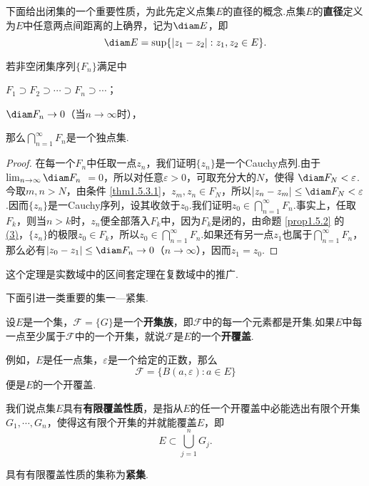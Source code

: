 下面给出闭集的一个重要性质，为此先定义点集$E$的直径的概念.点集$E$的\textbf{直径}定义为$E$中任意两点间距离的上确界，记为$\diam E$，即
\[\diam E=\sup\{|z_1-z_2|:z_1,z_2\in E\}.\]

\begin{theorem}\label{thm1.5.3}
  若非空闭集序列$\{F_n\}$满足中
  \begin{eenum}
    \item \label{thm1.5.3.1} $F_1\supset F_2\supset\cdots\supset F_n\supset\cdots$；
    \item \label{thm1.5.3.2} $\diam F_n\to 0$（当$n\to\infty$时），
  \end{eenum}
  那么$\bigcap_{n=1}^\infty F_n$是一个独点集.
\end{theorem}
\begin{proof}
在每一个$F_n$中任取一点$z_n$，我们证明$\{z_n\}$是一个Cauchy点列.由于$\lim_{n\to\infty}\diam F_n$ $=0$，所以对任意$\varepsilon>0$，可取充分大的$N$，使得 $\diam F_N<\varepsilon$.今取$m,n>N$，由条件 \ref{thm1.5.3.1}，$z_m,z_n\in F_N$，所以$|z_n-z_m|\le\diam F_N<\varepsilon$.因而$\{z_n\}$是一Cauchy序列，设其收敛于$z_0$.我们证明$z_0\in\bigcap_{n=1}^\infty F_n$.事实上，任取$F_k$，则当$n>k$时，$z_n$便全部落入$F_k$中，因为$F_k$是闭的，由命题 \ref{prop1.5.2} 的 \hyperlink{prop1.5.2.3}{(3)}，$\{z_n\}$的极限$z_0\in F_k$，所以$z_0\in\bigcap_{n=1}^\infty F_n$.如果还有另一点$z_1$也属于$\bigcap_{n=1}^\infty F_n$，那么必有$|z_0-z_1|\le\diam F_n\to0$（$n\to\infty$），因而$z_1=z_0$.
\end{proof}

这个定理是实数域中的区间套定理在复数域中的推广.

下面引进一类重要的集一—紧集.

设$E$是一个集，$\mathscr F=\{G\}$是一个\textbf{开集族}，即$\mathscr F$中的每一个元素都是开集.如果$E$中每一点至少属于$\mathscr F$中的一个开集，就说$\mathscr F$是$E$的一个\textbf{开覆盖}.

例如，$E$是任一点集，$\varepsilon$是一个给定的正数，那么
\[\mathscr F=\{B(a,\varepsilon):a\in E\}\]
便是$E$的一个开覆盖.

我们说点集$E$具有\textbf{有限覆盖性质}，是指从$E$的任一个开覆盖中必能选出有限个开集$G_1,\cdots,G_n$，使得这有限个开集的并就能覆盖$E$，即
\[E\subset\bigcup_{j=1}^nG_j.\]
\begin{definition}\label{def1.5.4}
具有有限覆盖性质的集称为\textbf{紧集}.
\end{definition}

